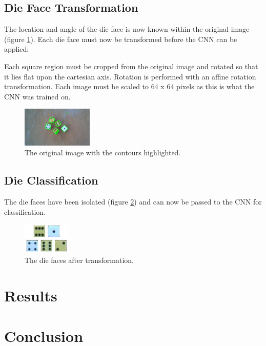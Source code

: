 \documentclass[conference]{IEEEtran}
\begin{document}
\subsection{Die Face Transformation}

The location and angle of the die face is now known within the original image (figure \ref{fig:canny}).
Each die face must now be transformed before the CNN can be applied:

Each square region must be cropped from the original image and rotated so that it lies flat upon the cartesian axis.
Rotation is performed with an affine rotation transformation.
Each image must be scaled to 64 x 64 pixels as this is what the CNN was trained on.
\begin{figure}
	\centering
	\includegraphics[width=0.3\textwidth]{canny}
	\caption{The original image with the contours highlighted.}
	\label{fig:canny}
\end{figure}

\subsection{Die Classification}

The die faces have been isolated (figure \ref{fig:faces}) and can now be passed to the CNN for classification.

\begin{figure}
	\centering
	\includegraphics[width=0.2\textwidth]{faces}
	\caption{The die faces after transformation.}
	\label{fig:faces}
\end{figure}
\section{Results}

\section{Conclusion}

\printbibliography
\end{document}
